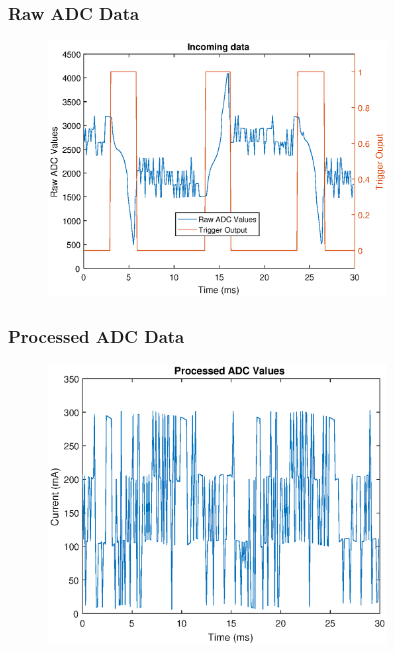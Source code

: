 \documentclass{beamer}
\begin{document}
	\begin{frame}\frametitle{Raw ADC Data}

		\begin{figure}
			\centering
			\includegraphics[width=0.8\textwidth]{ac-raw-data.eps}
		\end{figure}

	\end{frame}

	\begin{frame}\frametitle{Processed ADC Data}

		\begin{figure}
			\centering
			\includegraphics[width=0.8\textwidth]{ac-processed-data.eps}
		\end{figure}

	\end{frame}
\end{document}
